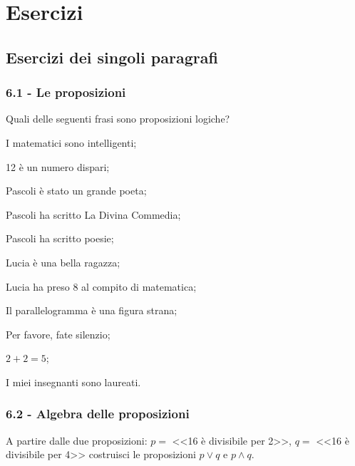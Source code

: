 \section{Esercizi}
\subsection{Esercizi dei singoli paragrafi}
\subsubsection*{6.1 - Le proposizioni}

\begin{esercizio}
\label{ese:6.1}
Quali delle seguenti frasi sono proposizioni logiche?
\begin{multicols}{2}
 \begin{enumeratea}
\item I matematici sono intelligenti;
\item 12 è un numero dispari;
\item Pascoli è stato un grande poeta;
\item Pascoli ha scritto La Divina Commedia;
\item Pascoli ha scritto poesie;
\item Lucia è una bella ragazza;
\item Lucia ha preso 8 al compito di matematica;
\item Il parallelogramma è una figura strana;
\item Per favore, fate silenzio;
\item $ 2+2=5 $;
\item I miei insegnanti sono laureati.
 \end{enumeratea}
\end{multicols}
\end{esercizio}

\subsubsection*{6.2 - Algebra delle proposizioni}

\begin{esercizio}
\label{ese:6.2}
A partire dalle due proposizioni: $ p = $ <<16 è divisibile per 2>>, $ q = $ <<16 è divisibile per
4>> costruisci le proposizioni $p\vee q$ e  $p\wedge q$.
\end{esercizio}

